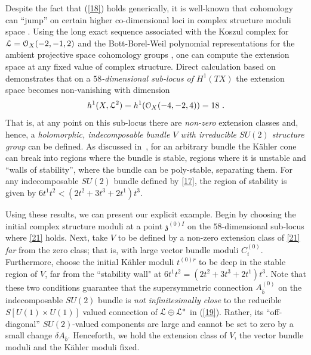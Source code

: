\documentclass[12pt]{article}
\numberwithin{equation}{section}
\newcommand{\eref}[1]{(\ref{#1})}
\begin{document}
Despite the fact that (\ref{18}) holds generically, it is well-known that cohomology can ``jump'' on certain higher co-dimensional loci in complex structure moduli space \cite{Anderson:2009mh,Anderson:2009ge,moduli,Braun:2005xp}. Using the long exact sequence associated with the Koszul complex for ${\cal{L}}={\cal{O}}_{X}(-2,-1,2)$ and the Bott-Borel-Weil polynomial representations for the ambient projective space cohomology groups \cite{Anderson:2007nc,Anderson:2008uw,Anderson:2008ex},  one can compute the extension space at any fixed value of complex structure. Direct calculation based on~\cite{Gray,cicy} demonstrates that on a {\it $58$-dimensional sub-locus of $H^{1}(TX)$} the extension space becomes non-vanishing with dimension
%
\begin{equation}
h^{1}(X,{\cal{L}}^{2})=h^{1}({\cal{O}}_{X}(-4,-2,4))= 18 \ .
\label{21}
\end{equation}
%
That is, at any point on this sub-locus there are {\it non-zero} extension classes and, hence, a {\it holomorphic, indecomposable bundle $V$ with irreducible $SU(2)$ structure group} can be defined. 
As discussed in~\cite{Anderson:2009sw,Anderson:2009nt}, for an arbitrary bundle the K\"ahler cone can break into regions where the bundle is stable, regions where it is  unstable and ``walls of stability'', where the bundle can be poly-stable, separating them. For any indecomposable $SU(2)$ bundle defined by \eqref{17}, the region of stability is given by $6t^{1}t^{2} < (2t^{2}+3t^{3}+2t^{1})t^{3}$.

Using these results, we can present our explicit example. Begin by choosing the initial complex structure moduli at a point ${\mathfrak{z}}^{(0)I}$ on the $58$-dimensional sub-locus where \eqref{21} holds. Next, take $V$ to be defined by a non-zero extension class of \eqref{21} {\it far} from the zero class; that is, with large vector bundle moduli ${C}^{(0)}_{i}$. Furthermore, choose the initial K\"ahler moduli $t^{(0)r}$ to be deep in the stable region of $V$, far from the ``stability wall" at $6t^{1}t^{2} = (2t^{2}+3t^{3}+2t^{1})t^{3}$. Note that these two conditions guarantee that the supersymmetric connection $A^{(0)}_{\bar{b}}$ on the indecomposable $SU(2)$ bundle is {\it not infinitesimally close} to the reducible $S[U(1) \times U(1)]$ valued connection of ${\cal{L}} \oplus {\cal{L}}^{*}$ in \eref{19}. Rather, its ``off-diagonal'' $SU(2)$-valued components are large and cannot be set to zero by a small change $\delta A_{\bar{b}}$. Henceforth, we hold  the extension class of $V$, the vector bundle moduli and the K\"ahler moduli fixed.
\end{document}
